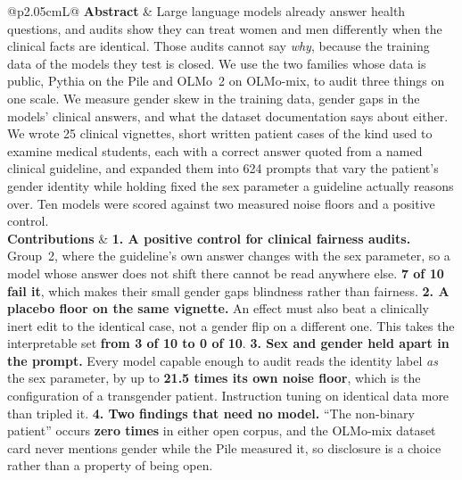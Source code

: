 \documentclass[11pt,twocolumn]{article}
\renewcommand{\arraystretch}{1.0}
\begin{document}
\begin{titlepage}
\vspace{0.95cm}
\begin{minipage}{0.95\linewidth}
\footnotesize
\setlength{\tabcolsep}{7pt}
\renewcommand{\arraystretch}{1.2}
\begin{tabularx}{\linewidth}{@{}p{2.05cm}L@{}}
\toprule
\textbf{\color{darkred}Abstract} &
Large language models already answer health questions, and audits show they can
treat women and men differently when the clinical facts are identical. Those
audits cannot say \emph{why}, because the training data of the models they test
is closed. We use the two families whose data is public, Pythia on the Pile and
OLMo~2 on OLMo-mix, to audit three things on one scale. We measure gender skew in the
training data, gender gaps in the models' clinical answers, and what the dataset
documentation says about either. We wrote 25 clinical vignettes, short written
patient cases of the kind used to examine medical students, each with a correct
answer quoted from a named clinical guideline, and expanded them into 624
prompts that vary the patient's gender identity while holding fixed the sex
parameter a guideline actually reasons over. Ten models were scored against two
measured noise floors and a positive control. \\
\midrule
\textbf{\color{darkred}Contributions} &
\textbf{1. A positive control for clinical fairness audits.} Group~2, where the
guideline's own answer changes with the sex parameter, so a model whose answer
does not shift there cannot be read anywhere else. \textbf{7 of 10 fail it},
which makes their small gender gaps blindness rather than fairness.
\newline
\textbf{2. A placebo floor on the same vignette.} An effect must also beat a
clinically inert edit to the identical case, not a gender flip on a different
one. This takes the interpretable set \textbf{from 3 of 10 to 0 of 10}.
\newline
\textbf{3. Sex and gender held apart in the prompt.} Every model capable enough
to audit reads the identity label \emph{as} the sex parameter, by up to
\textbf{21.5 times its own noise floor}, which is the configuration of a
transgender patient. Instruction tuning on identical data more than tripled it.
\newline
\textbf{4. Two findings that need no model.} ``The non-binary patient'' occurs
\textbf{zero times} in either open corpus, and the OLMo-mix dataset card never
mentions gender while the Pile measured it, so disclosure is a choice rather
than a property of being open. \\
\bottomrule
\end{tabularx}
\end{minipage}


\end{titlepage}
\end{document}

